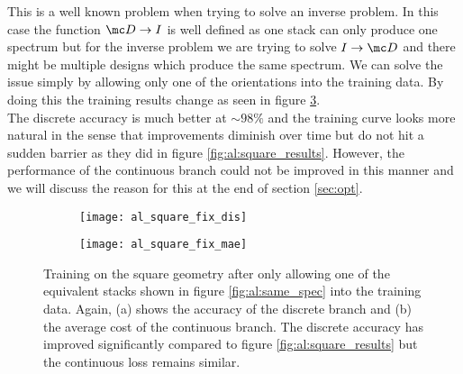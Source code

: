 \newpage
This is a well known problem when trying to solve an inverse problem.
In this case the function $\mc D \rightarrow I$ is well defined as one stack can only produce one spectrum but for the inverse problem we are trying to solve $I \rightarrow \mc D$ and there might be multiple designs which produce the same spectrum. We can solve the issue simply by allowing only one of the orientations into the training data. By doing this the training  results change as seen in figure \ref{fig:al:squares_fix}.
\\

\indent
The discrete accuracy is much better at $\sim 98 \%$ and the training curve looks more natural in the sense that improvements diminish over time but do not hit a sudden barrier as they did in figure \ref{fig:al:square_results}. However, the performance of the continuous branch could not be improved in this manner and we will discuss the reason for this at the end of section \ref{sec:opt}.

\begin{figure}[H]
\centering
\begin{subfigure}{.5\textwidth}
    \centering
    \texttt{[image: al\_square\_fix\_dis]}
    \caption{}
    \label{}
\end{subfigure}%
\begin{subfigure}{.5\textwidth}
    \centering
    \texttt{[image: al\_square\_fix\_mae]}
    \caption{}
    \label{}
\end{subfigure}
\caption{Training on the square geometry after only allowing one of the equivalent stacks shown in figure \ref{fig:al:same_spec} into the training data.
Again, (a) shows the accuracy of the discrete branch and (b) the average cost of the continuous branch. The discrete accuracy has improved significantly compared to figure \ref{fig:al:square_results} but the continuous loss remains similar.}
\label{fig:al:squares_fix}
\end{figure}

